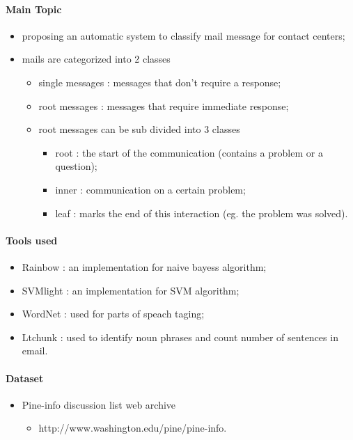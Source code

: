 \documentclass[12pt]{article}
\begin{document}
\paragraph{Main Topic}
\begin{itemize}
    \item proposing an automatic system to classify mail message for contact centers;
    \item mails are categorized into 2 classes
    \begin{itemize}
        \item single messages : messages that don’t require a response;
        \item root messages : messages that require immediate response;
        \item root messages can be sub divided into 3 classes
        \begin{itemize}
            \item root : the start of the communication (contains a problem or a question);
            \item inner : communication on a certain problem;
            \item leaf : marks the end of this interaction (eg. the problem was solved).
        \end{itemize}
    \end{itemize}
\end{itemize}

\paragraph{Tools used}
\begin{itemize}
    \item Rainbow : an implementation for naive bayess algorithm;
    \item SVMlight : an implementation for SVM algorithm;
    \item WordNet : used for parts of speach taging;
    \item Ltchunk : used to identify noun phrases and count number of sentences in email.
\end{itemize}

\paragraph{Dataset}
\begin{itemize}
    \item Pine-info discussion list web archive
    \begin{itemize}
        \item http://www.washington.edu/pine/pine-info.
    \end{itemize}
\end{itemize}
\end{document}
